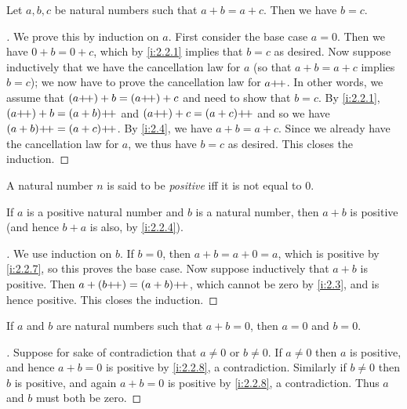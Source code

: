 \begin{prop}\label{i:2.2.6}
  Let \(a, b, c\) be natural numbers such that \(a + b = a + c\).
  Then we have \(b = c\).
\end{prop}

\begin{proof}[]
  We prove this by induction on \(a\).
  First consider the base case \(a = 0\).
  Then we have \(0 + b = 0 + c\), which by \cref{i:2.2.1} implies that \(b = c\) as desired.
  Now suppose inductively that we have the cancellation law for \(a\) (so that \(a + b = a + c\) implies \(b = c\));
  we now have to prove the cancellation law for \(a{+}\!{+}\).
  In other words, we assume that \((a{+}\!{+}) + b = (a{+}\!{+}) + c\) and need to show that \(b = c\).
  By \cref{i:2.2.1}, \((a{+}\!{+}) + b = (a + b){+}\!{+}\) and \((a{+}\!{+}) + c = (a + c){+}\!{+}\) and so we have \((a + b){+}\!{+} = (a + c){+}\!{+}\).
  By \cref{i:2.4}, we have \(a + b = a + c\).
  Since we already have the cancellation law for \(a\), we thus have \(b = c\) as desired.
  This closes the induction.
\end{proof}

\begin{defn}\label{i:2.2.7}
  A natural number \(n\) is said to be \emph{positive} iff it is not equal to \(0\).
\end{defn}

\begin{prop}\label{i:2.2.8}
  If \(a\) is a positive natural number and \(b\) is a natural number, then \(a + b\) is positive (and hence \(b + a\) is also, by \cref{i:2.2.4}).
\end{prop}

\begin{proof}[]
  We use induction on \(b\).
  If \(b = 0\), then \(a + b = a + 0 = a\), which is positive by \cref{i:2.2.7}, so this proves the base case.
  Now suppose inductively that \(a + b\) is positive.
  Then \(a + (b{+}\!{+}) = (a + b){+}\!{+}\), which cannot be zero by \cref{i:2.3}, and is hence positive.
  This closes the induction.
\end{proof}

\begin{cor}\label{i:2.2.9}
  If \(a\) and \(b\) are natural numbers such that \(a + b = 0\), then \(a = 0\) and \(b = 0\).
\end{cor}

\begin{proof}[]
  Suppose for sake of contradiction that \(a \neq 0\) or \(b \neq 0\).
  If \(a \neq 0\) then \(a\) is positive, and hence \(a + b = 0\) is positive by \cref{i:2.2.8}, a contradiction.
  Similarly if \(b \neq 0\) then \(b\) is positive, and again \(a + b = 0\) is positive by \cref{i:2.2.8}, a contradiction.
  Thus \(a\) and \(b\) must both be zero.
\end{proof}

